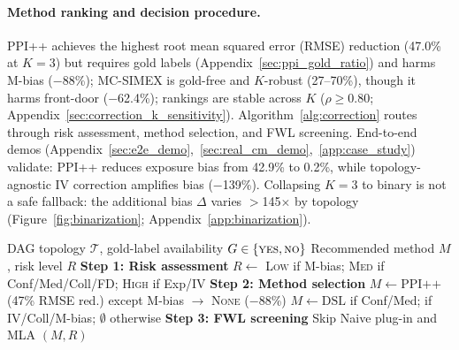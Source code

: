 \paragraph{Method ranking and decision procedure.}
PPI++ achieves the highest root mean squared error (RMSE) reduction (47.0\% at $K{=}3$) but requires gold labels (Appendix~\ref{sec:ppi_gold_ratio}) and harms M-bias ($-$88\%); MC-SIMEX is gold-free and $K$-robust (27--70\%), though it harms front-door ($-$62.4\%); rankings are stable across $K$ ($\rho \geq 0.80$; Appendix~\ref{sec:correction_k_sensitivity}). Algorithm~\ref{alg:correction} routes through risk assessment, method selection, and FWL screening. End-to-end demos (Appendix~\ref{sec:e2e_demo},~\ref{sec:real_cm_demo},~\ref{app:case_study}) validate: PPI++ reduces exposure bias from 42.9\% to 0.2\%, while topology-agnostic IV correction amplifies bias ($-$139\%). Collapsing $K{=}3$ to binary is not a safe fallback: the additional bias $\Delta$ varies $>$145$\times$ by topology (Figure~\ref{fig:binarization}; Appendix~\ref{app:binarization}).

\begin{algorithm}[t]
\caption{Correction method selection for LLM-annotated causal inference.}
\label{alg:correction}
\footnotesize
\begin{algorithmic}[1]
\REQUIRE DAG topology $\mathcal{T}$, gold-label availability $G \in \{\textsc{yes}, \textsc{no}\}$
\ENSURE Recommended method $M$, risk level $R$
\STATE \textbf{Step 1: Risk assessment} 
\STATE $R \gets$ \textsc{Low} if M-bias; \textsc{Med} if Conf/Med/Coll/FD; \textsc{High} if Exp/IV
\STATE \textbf{Step 2: Method selection}
    \STATE $M \gets \text{PPI++}$ (47\% RMSE red.) except M-bias $\to$ \textsc{None} ($-$88\%)
\ELSE
    \STATE $M \gets \text{DSL}$ if Conf/Med;  if IV/Coll/M-bias; $\emptyset$ otherwise
\ENDIF
\STATE \textbf{Step 3: FWL screening}
    \STATE Skip Naive plug-in and MLA 
\ENDIF
\RETURN $(M, R)$
\end{algorithmic}
\end{algorithm}
